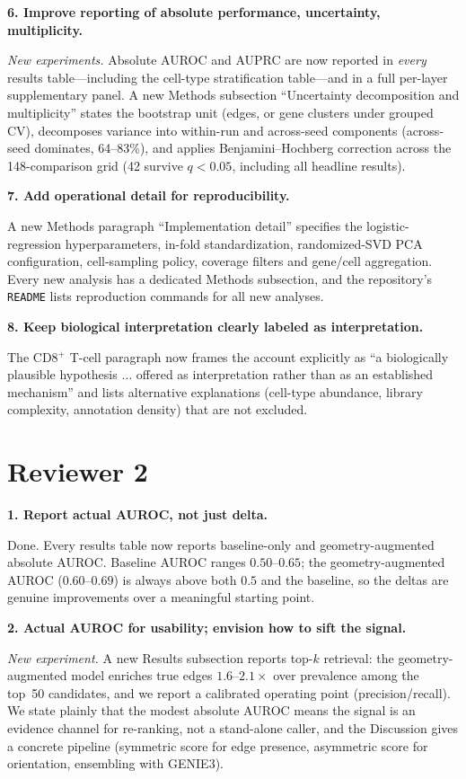 \documentclass[11pt]{article}
\newcommand{\rc}[1]{\medskip\noindent\textbf{#1}\par}
\begin{document}
\rc{6. Improve reporting of absolute performance, uncertainty, multiplicity.}
\textit{New experiments.} Absolute
AUROC and AUPRC are now reported in \emph{every} results table---including the
cell-type stratification table---and in a full per-layer supplementary panel. A
new Methods subsection ``Uncertainty decomposition and multiplicity'' states the
bootstrap unit (edges, or gene clusters under grouped CV), decomposes variance
into within-run and across-seed components (across-seed dominates, 64--83\%), and
applies Benjamini--Hochberg correction across the 148-comparison grid (42 survive
$q<0.05$, including all headline results).

\rc{7. Add operational detail for reproducibility.}
A new Methods paragraph ``Implementation detail'' specifies the
logistic-regression hyperparameters, in-fold standardization, randomized-SVD PCA
configuration, cell-sampling policy, coverage filters and gene/cell aggregation.
Every new analysis has a dedicated Methods subsection, and the repository's
\texttt{README} lists reproduction commands for all new analyses.

\rc{8. Keep biological interpretation clearly labeled as interpretation.}
The CD8$^+$ T-cell paragraph now frames the account explicitly as ``a
biologically plausible hypothesis $\ldots$ offered as interpretation rather than
as an established mechanism'' and lists alternative explanations (cell-type
abundance, library complexity, annotation density) that are not excluded.

\section{Reviewer 2}

\rc{1. Report actual AUROC, not just delta.}
Done. Every results table now reports baseline-only and
geometry-augmented absolute AUROC. Baseline AUROC ranges $0.50$--$0.65$; the
geometry-augmented AUROC ($0.60$--$0.69$) is always above both $0.5$ and the
baseline, so the deltas are genuine improvements over a meaningful starting
point.

\rc{2. Actual AUROC for usability; envision how to sift the signal.}
\textit{New experiment.} A new Results subsection reports top-$k$
retrieval: the geometry-augmented model enriches true edges $1.6$--$2.1\times$
over prevalence among the top~50 candidates, and we report a calibrated operating
point (precision/recall). We state plainly that the modest absolute AUROC means
the signal is an evidence channel for re-ranking, not a stand-alone caller, and
the Discussion gives a concrete pipeline (symmetric score for edge presence,
asymmetric score for orientation, ensembling with GENIE3).
\end{document}
